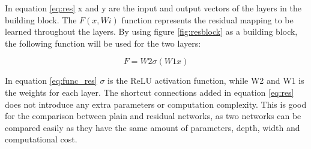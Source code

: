 In equation \ref{eq:res} x and y are the input and output vectors of the layers in the building block. The $F(x,{Wi})$ function represents the residual mapping to be learned throughout the layers. By using figure \ref{fig:resblock} as a building block, the following function will be used for the two layers: 

\begin{equation} \label{eq:func_res}
F = W2\sigma(W1x)
\end{equation} 

In equation \ref{eq:func_res} $\sigma$ is the ReLU activation function, while W2 and W1 is the weights for each layer. The shortcut connections added in equation \ref{eq:res} does not introduce any extra parameters or computation complexity. This is good for the comparison between plain and residual networks, as two networks can be compared easily as they have the same amount of parameters, depth, width and computational cost.